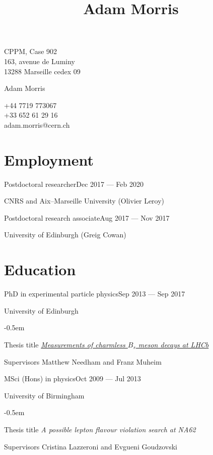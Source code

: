 \documentclass[contbibnum,titleabove]{simplecv}
\title{Adam Morris}
\newcommand\dateditem[2]{\vspace{0.5em}#1\hfill#2\par}
\newcommand\topictitle[3]{\par\dateditem{#1}{#3}{\color{darkgray}#2}}
\begin{document}
	\fontfamily{\typeface}\selectfont
	\noindent\begin{minipage}{0.33\textwidth}
	CPPM, Case 902\\163, avenue de Luminy\\13288 Marseille cedex 09
	\end{minipage}
	\noindent\begin{minipage}{0.33\textwidth}
	\centering
	\Huge Adam Morris
	\end{minipage}
	\noindent\begin{minipage}{0.33\textwidth}
	\raggedleft
	+44 7719 773067\\+33 652 61 29 16\\{adam.morris@cern.ch}
	\end{minipage}
	\section{Employment}
	\topictitle{Postdoctoral researcher}{CNRS and Aix--Marseille University (Olivier Leroy)}{Dec 2017 --- Feb 2020}
	\topictitle{Postdoctoral research associate}{University of Edinburgh (Greig Cowan)}{Aug 2017 --- Nov 2017}
	\section{Education}
	\topictitle{PhD in experimental particle physics}{University of Edinburgh}{Sep 2013 --- Sep 2017}
	\begin{topic}
	\itemsep-0.5em
		\item[Thesis title]{\href{https://cds.cern.ch/record/2293045}{\textit{Measurements of charmless $B_s$ meson decays at LHCb}}}
		\item[Supervisors]{Matthew Needham and Franz Muheim}
	\end{topic}
	\topictitle{MSci (Hons) in physics}{University of Birmingham}{Oct 2009 --- Jul 2013}
	\begin{topic}
		\itemsep-0.5em
		\item[Thesis title]{\textit{A possible lepton flavour violation search at NA62}}
		\item[Supervisors]{Cristina Lazzeroni and Evgueni Goudzovski}
	\end{topic}
\end{document}

